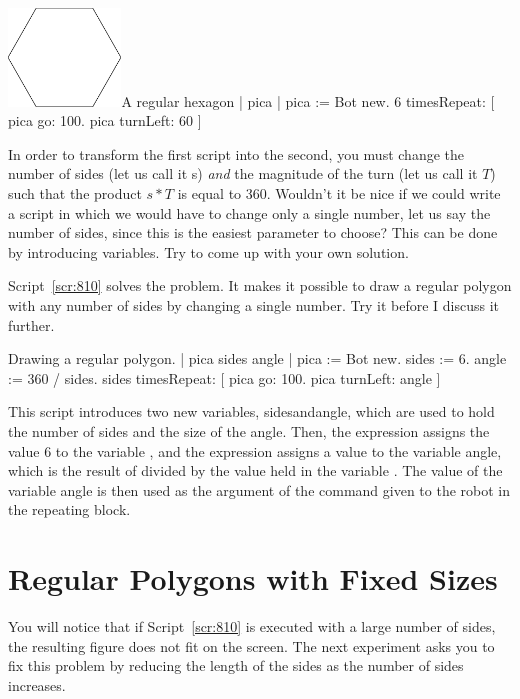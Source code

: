 \documentclass[a4paper,10pt,twoside]{book}
\begin{document}
\begin{scriptfigwithsize}[0.4]{\includegraphics[width=3cm]{varFHexagon}}{A regular hexagon}\label{scr:89}
| pica | 
pica := Bot new. 
6 timesRepeat: 
	[ pica go: 100. 
	pica turnLeft: 60 ]
\end{scriptfigwithsize}

In order to transform the first script into the second, you must change the number of 
sides (let us call it s) \emph{and} the magnitude of the turn (let us call it $T$) such that the product $s*T$ 
is equal to 360. Wouldn’t it be nice if we could write a script in which we would have to change 
only a single number, let us say the number of sides, since this is the easiest parameter to 
choose? This can be done by introducing variables. Try to come up with your own solution. 

Script~\ref{scr:810} solves the problem. It makes it possible to draw a regular polygon with any 
number of sides by changing a single number. Try it before I discuss it further. 

\begin{script}[810]{Drawing a regular polygon.}
| pica sides angle | 
pica := Bot new. 
sides := 6. 
angle := 360 / sides. 
sides timesRepeat: 
	[ pica go: 100. 
	pica turnLeft: angle ]
\end{script}

This script introduces two new variables, sidesandangle, which are used to hold the 
number of sides and the size of the angle. Then, the expression  assigns the value 6 
to the variable , and the expression  assigns a value to the variable 
angle, which is the result of  divided by the value held in the variable . The value of 
the variable angle is then used as the argument of the command  given to the robot 
in the repeating block. 

\section{Regular Polygons with Fixed Sizes} 

You will notice that if Script~\ref{scr:810} is executed with a large number of sides, the resulting figure 
does not fit on the screen. The next experiment asks you to fix this problem by reducing the 
length of the sides as the number of sides increases. 
\end{document}
